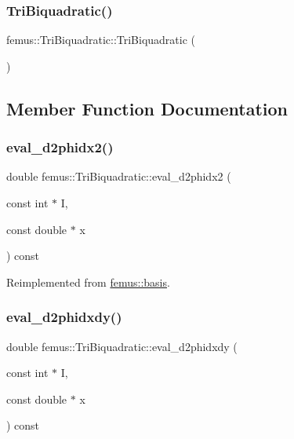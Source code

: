 \subsubsection{\texorpdfstring{Tri\+Biquadratic()}{TriBiquadratic()}}
{\footnotesize\ttfamily femus\+::\+Tri\+Biquadratic\+::\+Tri\+Biquadratic (\begin{DoxyParamCaption}{ }\end{DoxyParamCaption})\hspace{0.3cm}{\ttfamily [inline]}}



\subsection{Member Function Documentation}
\mbox{\label{classfemus_1_1_tri_biquadratic_a671d38cd3a1c851e54d71e3a53c85039}} 
\subsubsection{\texorpdfstring{eval\+\_\+d2phidx2()}{eval\_d2phidx2()}}
{\footnotesize\ttfamily double femus\+::\+Tri\+Biquadratic\+::eval\+\_\+d2phidx2 (\begin{DoxyParamCaption}\item[{const int $\ast$}]{I,  }\item[{const double $\ast$}]{x }\end{DoxyParamCaption}) const\hspace{0.3cm}{\ttfamily [virtual]}}



Reimplemented from \mbox{\hyperlink{classfemus_1_1basis_a0a9839e75d1c9c8302486fc072eed028}{femus\+::basis}}.

\mbox{\label{classfemus_1_1_tri_biquadratic_add4c6b1cf71bc83b7d480337d5800808}} 
\subsubsection{\texorpdfstring{eval\+\_\+d2phidxdy()}{eval\_d2phidxdy()}}
{\footnotesize\ttfamily double femus\+::\+Tri\+Biquadratic\+::eval\+\_\+d2phidxdy (\begin{DoxyParamCaption}\item[{const int $\ast$}]{I,  }\item[{const double $\ast$}]{x }\end{DoxyParamCaption}) const\hspace{0.3cm}{\ttfamily [virtual]}}



